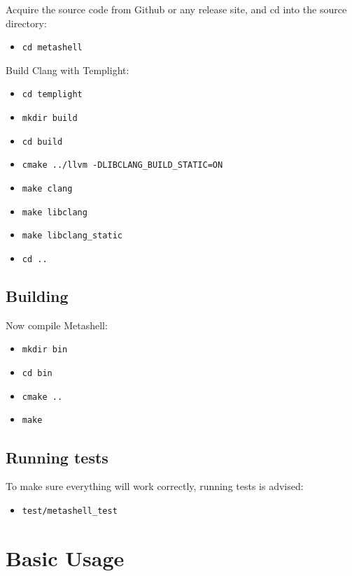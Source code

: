 Acquire the source code from Github\cite{github} or any release site, and cd
into the source directory:

\begin{itemize}
    \item \verb$cd metashell$
\end{itemize}

Build Clang with Templight\cite{templight}:

\begin{itemize}
    \item \verb$cd templight$
    \item \verb$mkdir build$
    \item \verb$cd build$
    \item \verb$cmake ../llvm -DLIBCLANG_BUILD_STATIC=ON$
    \item \verb$make clang$
    \item \verb$make libclang$
    \item \verb$make libclang_static$
    \item \verb$cd ..$
\end{itemize}

\subsection{Building}

Now compile Metashell:

\begin{itemize}
    \item \verb$mkdir bin$
    \item \verb$cd bin$
    \item \verb$cmake ..$
    \item \verb$make$
\end{itemize}


\subsection{Running tests}

To make sure everything will work correctly, running tests is advised:

\begin{itemize}
    \item \verb$test/metashell_test$
\end{itemize}

\section{Basic Usage}

